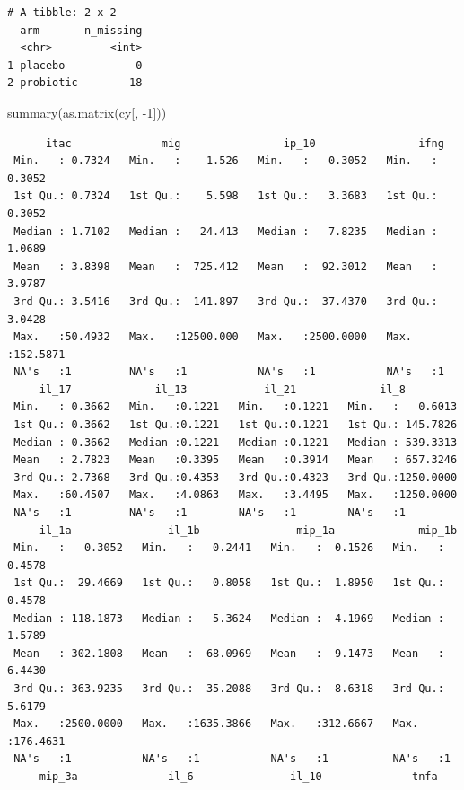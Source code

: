 \documentclass[
  letterpaper,
  DIV=11,
  numbers=noendperiod]{scrartcl}
\newenvironment{Shaded}{\begin{snugshade}}{\end{snugshade}}
\newcommand{\DecValTok}[1]{\textcolor[rgb]{0.68,0.00,0.00}{#1}}
\newcommand{\FunctionTok}[1]{\textcolor[rgb]{0.28,0.35,0.67}{#1}}
\newcommand{\NormalTok}[1]{\textcolor[rgb]{0.00,0.23,0.31}{#1}}
\newcommand{\SpecialCharTok}[1]{\textcolor[rgb]{0.37,0.37,0.37}{#1}}
\begin{document}
\begin{verbatim}
# A tibble: 2 x 2
  arm       n_missing
  <chr>         <int>
1 placebo           0
2 probiotic        18
\end{verbatim}

\begin{Shaded}
\begin{Highlighting}[]
\FunctionTok{summary}\NormalTok{(}\FunctionTok{as.matrix}\NormalTok{(cy[, }\SpecialCharTok{{-}}\DecValTok{1}\NormalTok{]))}
\end{Highlighting}
\end{Shaded}

\begin{verbatim}
      itac              mig                ip_10                ifng         
 Min.   : 0.7324   Min.   :    1.526   Min.   :   0.3052   Min.   :  0.3052  
 1st Qu.: 0.7324   1st Qu.:    5.598   1st Qu.:   3.3683   1st Qu.:  0.3052  
 Median : 1.7102   Median :   24.413   Median :   7.8235   Median :  1.0689  
 Mean   : 3.8398   Mean   :  725.412   Mean   :  92.3012   Mean   :  3.9787  
 3rd Qu.: 3.5416   3rd Qu.:  141.897   3rd Qu.:  37.4370   3rd Qu.:  3.0428  
 Max.   :50.4932   Max.   :12500.000   Max.   :2500.0000   Max.   :152.5871  
 NA's   :1         NA's   :1           NA's   :1           NA's   :1         
     il_17             il_13            il_21             il_8          
 Min.   : 0.3662   Min.   :0.1221   Min.   :0.1221   Min.   :   0.6013  
 1st Qu.: 0.3662   1st Qu.:0.1221   1st Qu.:0.1221   1st Qu.: 145.7826  
 Median : 0.3662   Median :0.1221   Median :0.1221   Median : 539.3313  
 Mean   : 2.7823   Mean   :0.3395   Mean   :0.3914   Mean   : 657.3246  
 3rd Qu.: 2.7368   3rd Qu.:0.4353   3rd Qu.:0.4323   3rd Qu.:1250.0000  
 Max.   :60.4507   Max.   :4.0863   Max.   :3.4495   Max.   :1250.0000  
 NA's   :1         NA's   :1        NA's   :1        NA's   :1          
     il_1a               il_1b               mip_1a             mip_1b        
 Min.   :   0.3052   Min.   :   0.2441   Min.   :  0.1526   Min.   :  0.4578  
 1st Qu.:  29.4669   1st Qu.:   0.8058   1st Qu.:  1.8950   1st Qu.:  0.4578  
 Median : 118.1873   Median :   5.3624   Median :  4.1969   Median :  1.5789  
 Mean   : 302.1808   Mean   :  68.0969   Mean   :  9.1473   Mean   :  6.4430  
 3rd Qu.: 363.9235   3rd Qu.:  35.2088   3rd Qu.:  8.6318   3rd Qu.:  5.6179  
 Max.   :2500.0000   Max.   :1635.3866   Max.   :312.6667   Max.   :176.4631  
 NA's   :1           NA's   :1           NA's   :1          NA's   :1         
     mip_3a              il_6               il_10              tnfa         

\end{verbatim}
\end{document}
